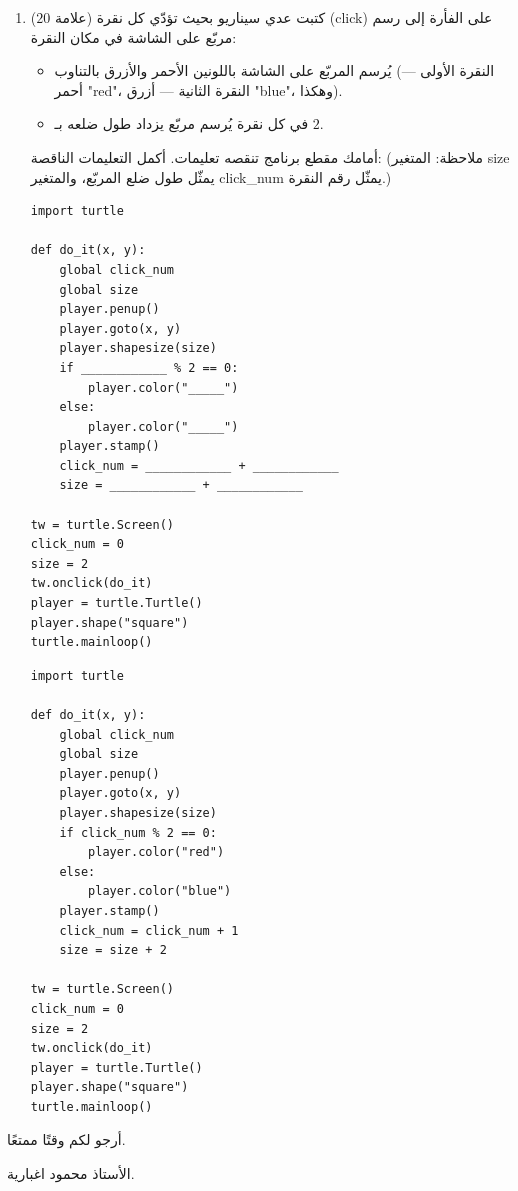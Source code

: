 \documentclass[14pt]{extarticle}
\begin{document}
\begin{enumerate}[resume, label=\textbf{السؤال \arabic*:}, wide=0pt, itemsep=2.2em]
\item ($20$ علامة) كتبت عدي سيناريو بحيث تؤدّي كل نقرة (\textenglish{click}) على الفأرة إلى رسم مربّع على الشاشة في مكان النقرة:
\begin{itemize}
\item يُرسم المربّع على الشاشة باللونين الأحمر والأزرق بالتناوب (النقرة الأولى — أحمر \textenglish{"red"}، النقرة الثانية — أزرق \textenglish{"blue"}، وهكذا).
\item في كل نقرة يُرسم مربّع يزداد طول ضلعه بـ $2$.
\end{itemize}
أمامك مقطع برنامج تنقصه تعليمات. أكمل التعليمات الناقصة:
(ملاحظة: المتغير \textenglish{size} يمثّل طول ضلع المربّع، والمتغير \textenglish{click\_num} يمثّل رقم النقرة.)

\begin{boxCode}
\begin{english}
\begin{verbatim}
import turtle

def do_it(x, y):
    global click_num
    global size
    player.penup()
    player.goto(x, y)
    player.shapesize(size)
    if ____________ % 2 == 0:
        player.color("_____")
    else:
        player.color("_____")
    player.stamp()
    click_num = ____________ + ____________
    size = ____________ + ____________

tw = turtle.Screen()
click_num = 0
size = 2
tw.onclick(do_it)
player = turtle.Turtle()
player.shape("square")
turtle.mainloop()
\end{verbatim}
\end{english}
\end{boxCode}

\ifwithsols
\begin{boxSolution}
\begin{english}
\begin{verbatim}
import turtle

def do_it(x, y):
    global click_num
    global size
    player.penup()
    player.goto(x, y)
    player.shapesize(size)
    if click_num % 2 == 0:
        player.color("red")
    else:
        player.color("blue")
    player.stamp()
    click_num = click_num + 1
    size = size + 2

tw = turtle.Screen()
click_num = 0
size = 2
tw.onclick(do_it)
player = turtle.Turtle()
player.shape("square")
turtle.mainloop()
\end{verbatim}
\end{english}
\end{boxSolution}
\fi
\filbreak

\end{enumerate}

\vspace{1cm}
\begin{flushleft}
أرجو لكم وقتًا ممتعًا.

الأستاذ محمود اغبارية.
\end{flushleft}
\end{document}
